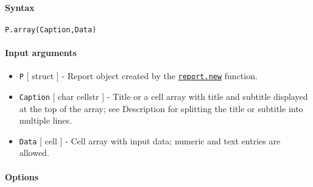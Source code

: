 


	\paragraph{Syntax}\label{syntax}

\begin{verbatim}
P.array(Caption,Data)
\end{verbatim}

\paragraph{Input arguments}\label{input-arguments}

\begin{itemize}
\item
  \texttt{P} {[} struct {]} - Report object created by the
  \href{report/new}{\texttt{report.new}} function.
\item
  \texttt{Caption} {[} char \textbar{} cellstr {]} - Title or a cell
  array with title and subtitle displayed at the top of the array; see
  Description for splitting the title or subtitle into multiple lines.
\item
  \texttt{Data} {[} cell {]} - Cell array with input data; numeric and
  text entries are allowed.
\end{itemize}

\paragraph{Options}\label{options}

